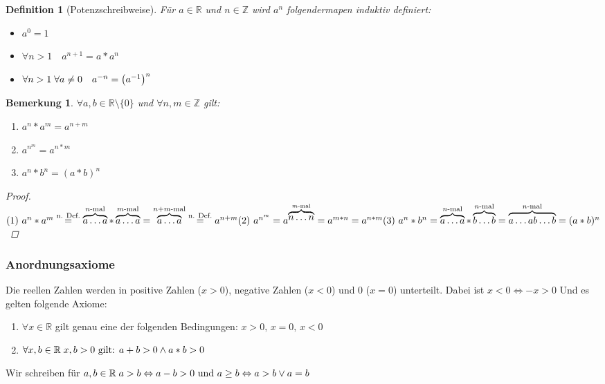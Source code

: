 \documentclass[a4paper,titlepage,oneside]{article}
\def\Z{\ensuremath{\mathbb{Z}} }
\def\R{\ensuremath{\mathbb{R}} }
\newcommand{\fa}[1]{\ensuremath{\forall#1}}
\newcommand{\fain}[2]{\ensuremath{\forall#1\in#2}}
\def\sp{\hspace{0,1cm}}
\theoremstyle{thmstyle}
\newtheorem{defi}[satz]{Definition}
\newtheorem{bem}[satz]{Bemerkung}
\begin{document}
\begin{defi}[Potenzschreibweise]
Für $a \in \R $ und $n \in \Z$ wird $a^n$ folgendermapen induktiv definiert:
\begin{itemize}
\item $a^0 = 1$ 
\item $\fa n > 1 \quad a^{n+1} = a * a^n $
\item $ \fa n > 1 \sp \fa a \ne 0 \quad a^{-n} = \left(a^{-1}\right)^n$
\end{itemize}
\end{defi}
\newpage
\begin{bem}
\fain{ a, b}{\R \setminus \{0\}} und \fain{n, m}{\Z} gilt:
\begin{enumerate}[label=(\arabic*)]
\item \(a^n * a^m = a^{n+m} \)
\item \(a^{n^m} = a^{n * m} \)
\item \(a^n * b^n = (a * b)^n \)
\end{enumerate}
\begin{proof}
\begin{math}\\
\text{(1) } a^n * a^m \overset{\text{n. Def.}}{=} \overbrace{a \dots a}^{n\text{-mal}}*\overbrace{a \dots a}^{m\text{-mal}} = \overbrace{a \dots a}^{n+m\text{-mal}} \overset{\text{n. Def.}}{=} a^{n+m}\\
\text{(2) }  a^{n^m} = a^{\overbrace{n \dots n}^{m\text{-mal}}} = a^{m * n} = a^{n*m}\\
\text{(3) }  a^n * b^n = \overbrace{a \dots a}^{n\text{-mal}}*\overbrace{b \dots b}^{n\text{-mal}} = \overbrace{a \dots a b \dots b}^{n\text{-mal}} = (a*b)^{n}\\
\end{math}
\end{proof}
\end{bem}

\subsubsection{Anordnungsaxiome}
Die reellen Zahlen werden in positive Zahlen ($x > 0$), negative Zahlen ($x < 0$) und 0 ($x = 0$) unterteilt. Dabei ist $x < 0 \Leftrightarrow -x > 0$
Und es gelten folgende Axiome:
\begin{enumerate}[label=(\arabic*)]
\item \(\fa x \in \R \) gilt genau eine der folgenden Bedingungen: \(x > 0\text{, } x = 0\text{, } x < 0 \)
\item \(\fa x,b \in \R \sp x,b > 0 \text{ gilt: } a + b > 0 \land a * b > 0\)
\end{enumerate}
Wir schreiben für $a, b \in \R \sp a > b \Leftrightarrow a - b > 0\text{ und }a \ge b \Leftrightarrow a > b \lor a = b $
\end{document}
